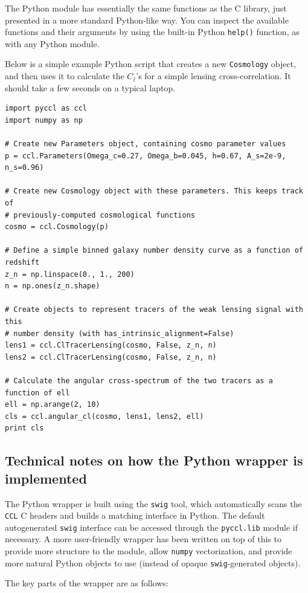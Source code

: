 \documentclass[\docopts]{\docclass}
\begin{document}
The Python module has essentially the same functions as the C library, just presented in a more standard Python-like way. You can inspect the available functions and their arguments by using the built-in Python {\tt help()} function, as with any Python module.

Below is a simple example Python script that creates a new {\tt Cosmology} object, and then uses it to calculate the $C_\ell$'s for a simple lensing cross-correlation. It should take a few seconds on a typical laptop.

\begin{verbatim}
import pyccl as ccl
import numpy as np

# Create new Parameters object, containing cosmo parameter values
p = ccl.Parameters(Omega_c=0.27, Omega_b=0.045, h=0.67, A_s=2e-9, n_s=0.96)

# Create new Cosmology object with these parameters. This keeps track of
# previously-computed cosmological functions
cosmo = ccl.Cosmology(p)

# Define a simple binned galaxy number density curve as a function of redshift
z_n = np.linspace(0., 1., 200)
n = np.ones(z_n.shape)

# Create objects to represent tracers of the weak lensing signal with this
# number density (with has_intrinsic_alignment=False)
lens1 = ccl.ClTracerLensing(cosmo, False, z_n, n)
lens2 = ccl.ClTracerLensing(cosmo, False, z_n, n)

# Calculate the angular cross-spectrum of the two tracers as a function of ell
ell = np.arange(2, 10)
cls = ccl.angular_cl(cosmo, lens1, lens2, ell)
print cls
\end{verbatim}

\subsection{Technical notes on how the Python wrapper is implemented}
\label{sec:python:technical}

The Python wrapper is built using the {\tt swig} tool, which automatically scans the {\tt CCL} C headers and builds a matching interface in Python. The default autogenerated {\tt swig} interface can be accessed through the {\tt pyccl.lib} module if necessary. A more user-friendly wrapper has been written on top of this to provide more structure to the module, allow {\tt numpy} vectorization, and provide more natural Python objects to use (instead of opaque {\tt swig}-generated objects).

The key parts of the wrapper are as follows:
\end{document}
